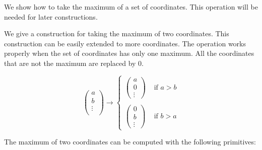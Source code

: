 We show how to take the maximum of a set of coordinates.
This operation will be needed for later constructions.

We give a construction for taking the maximum of two coordinates.
This construction can be easily extended to more coordinates.
The operation works properly when the set of coordinates has only one maximum.
All the coordinates that are not the maximum are replaced by $0$.

\begin{equation*}
    \left( \begin{matrix} a \\ b \\ \vdots \\\end{matrix} \right)
    \rightarrow 
    \begin{cases}
        \left( \begin{matrix} a \\ 0 \\ \vdots \end{matrix} \right) & \text{ if } a > b \\
        \\
        \left( \begin{matrix} 0 \\ b \\ \vdots \end{matrix} \right) & \text{ if } b > a 
    \end{cases}
\end{equation*}

\bigskip

The maximum of two coordinates can be computed with the following primitives:

